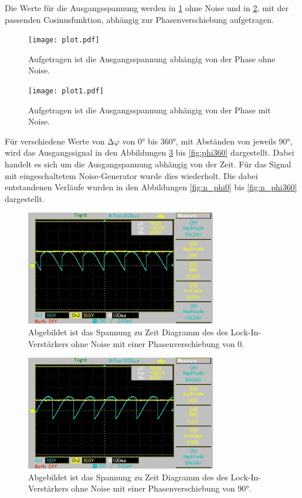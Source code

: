 Die Werte für die Ausgangsspannung werden in \ref{fig:plot} ohne Noise und in \ref{fig:plot1}, mit der passenden Cosinusfunktion, abhängig zur Phasenverschiebung aufgetragen.

\begin{figure}[H]
  \centering
  \texttt{[image: plot.pdf]}
  \caption{Aufgetragen ist die Ausgangsspannung abhängig von der Phase ohne Noise.}
  \label{fig:plot}
\end{figure}

\begin{figure}[H]
  \centering
  \texttt{[image: plot1.pdf]}
  \caption{Aufgetragen ist die Ausgangsspannung abhängig von der Phase mit Noise.}
  \label{fig:plot1}
\end{figure}



Für verschiedene Werte von $\increment \varphi$ von 0° bis 360°, mit Abständen von jeweils 90°, wird das Ausgangssignal in den Abbildungen \ref{fig:phi0} bis \ref{fig:phi360} dargestellt.
Dabei handelt es sich um die Ausgangspannung abhängig von der Zeit. 
Für das Signal mit eingeschaltetem Noise-Generator wurde dies wiederholt.
Die dabei entstandenen Verläufe wurden in den Abbildungen \ref{fig:n_phi0} bis \ref{fig:n_phi360} dargestellt.

\begin{figure}[H]
  \centering
  \includegraphics[height=5cm]{Bilder/phi0.jpg}
  \caption{Abgebildet ist das Spannung zu Zeit Diagramm des des Lock-In-Verstärkers ohne Noise mit einer Phasenverschiebung von 0.}
  \label{fig:phi0}
\end{figure}

\begin{figure}[H]
  \centering
  \includegraphics[height=5cm]{Bilder/phi90.jpg}
  \caption{Abgebildet ist das Spannung zu Zeit Diagramm des des Lock-In-Verstärkers ohne Noise mit einer Phasenverschiebung von 90°.}
  \label{fig:phi90}
\end{figure}

